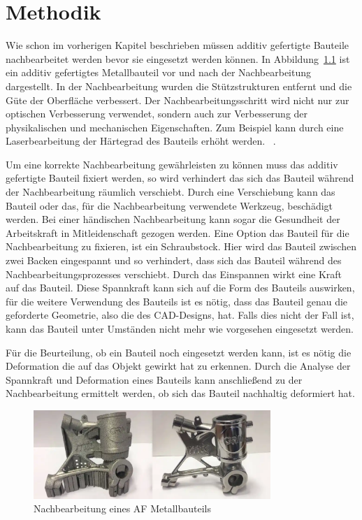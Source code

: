 \chapter{Methodik}

Wie schon im vorherigen Kapitel beschrieben müssen additiv gefertigte Bauteile 
nachbearbeitet werden bevor sie eingesetzt werden können. In Abbildung~\ref{fig:post-pro}
ist ein additiv gefertigtes Metallbauteil vor und nach der Nachbearbeitung dargestellt.
In der Nachbearbeitung wurden die Stützstrukturen entfernt und die Güte der Oberfläche 
verbessert. 
Der Nachbearbeitungsschritt wird nicht nur zur optischen Verbesserung verwendet, sondern 
auch zur Verbesserung der physikalischen und mechanischen Eigenschaften. 
Zum Beispiel kann durch eine Laserbearbeitung der Härtegrad des Bauteils erhöht werden.
~\cite{Mahmood.2022}.

Um eine korrekte Nachbearbeitung gewährleisten zu können muss das additiv 
gefertigte Bauteil fixiert werden, so wird verhindert das sich das Bauteil während der 
Nachbearbeitung räumlich verschiebt. Durch eine Verschiebung kann das Bauteil oder das, für
die Nachbearbeitung verwendete Werkzeug, beschädigt werden. Bei einer händischen 
Nachbearbeitung kann sogar die Gesundheit der Arbeitskraft in Mitleidenschaft gezogen werden.
Eine Option das Bauteil für die Nachbearbeitung zu fixieren, ist ein Schraubstock. 
Hier wird das Bauteil zwischen zwei Backen eingespannt und so verhindert, dass sich das
Bauteil während des Nachbearbeitungsprozesses verschiebt. Durch das Einspannen wirkt eine 
Kraft auf das Bauteil. Diese Spannkraft kann sich auf die Form des Bauteils auswirken, für 
die weitere Verwendung des Bauteils ist es nötig, dass das Bauteil genau die geforderte 
Geometrie, also die des CAD-Designs, hat. Falls dies nicht der Fall ist, kann das Bauteil
unter Umständen nicht mehr wie vorgesehen eingesetzt werden.

Für die Beurteilung, ob ein Bauteil noch eingesetzt werden kann, ist es nötig die 
Deformation die auf das Objekt gewirkt hat zu erkennen. Durch die Analyse der Spannkraft 
und Deformation eines Bauteils kann anschließend zu der Nachbearbeitung ermittelt werden, 
ob sich das Bauteil nachhaltig deformiert hat.

\begin{figure}[H]
    \centering
    \includegraphics[width=0.8\textwidth]{images/post-processing.PNG}
    \caption{Nachbearbeitung eines AF Metallbauteils~\cite{unionfab.22.08.2023}}
    \label{fig:post-pro}
\end{figure}

